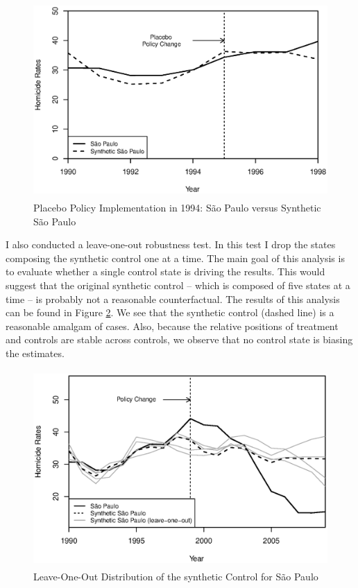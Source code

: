 \begin{figure}[H]
    \centering
    \includegraphics[height=7.5cm]{images/placebo.eps}
    \caption{Placebo Policy Implementation in 1994: São Paulo versus Synthetic São Paulo}
    \label{fig:figure4}
\end{figure}

I also conducted a leave-one-out robustness test. In this test I drop the states composing the synthetic control one at a time. The main goal of this analysis is to evaluate whether a single control state is driving the results. This would suggest that the original synthetic control -- which is composed of five states at a time -- is probably not a reasonable counterfactual. The results of this analysis can be found in Figure \ref{fig:figure5}. We see that the synthetic control (dashed line) is a reasonable amalgam of cases. Also, because the relative positions of treatment and controls are stable across controls, we observe that no control state is biasing the estimates.

\begin{figure}[H]
    \centering
    \includegraphics[height=7.5cm]{images/leave-one-out.eps}
    \caption{Leave-One-Out Distribution of the synthetic Control for São Paulo}
    \label{fig:figure5}
\end{figure}

